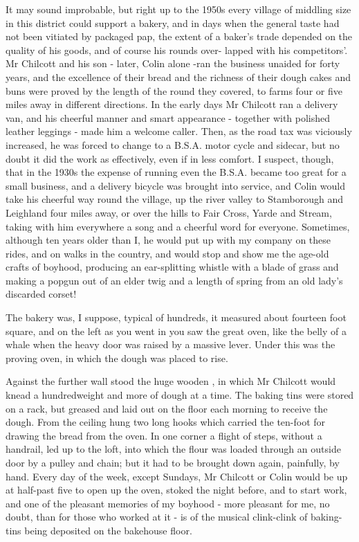 It may sound improbable, but right up to the 1950s every village of middling size in this district could support a bakery, and in days when the general taste had not been vitiated by packaged pap, the extent of a baker's trade depended on the quality of his goods, and of course his rounds over- lapped with his competitors'. Mr Chilcott and his son - later, Colin alone -ran the business unaided for forty years, and the excellence of their bread and the richness of their dough cakes and buns were proved by the length of the round they covered, to farms four or five miles away in different directions. In the early days Mr Chilcott ran a delivery van, and his cheerful manner and smart appearance - together with polished leather leggings - made him a welcome caller. Then, as the road tax was viciously increased, he was forced to change to a B.S.A. motor cycle and sidecar, but no doubt it did the work as effectively, even if in less comfort. I suspect, though, that in the 1930s the expense of running even the B.S.A. became too great for a small business, and a delivery bicycle was brought into service, and Colin would take his cheerful way round the village, up the river valley to Stamborough and Leighland four miles away, or over the hills to Fair Cross, Yarde and Stream, taking with him everywhere a song and a cheerful word for everyone. Sometimes, although ten years older than I, he would put up with my company on these rides, and on walks in the country, and would stop and show me the age-old crafts of boyhood, producing an ear-splitting whistle with a blade of grass and making a popgun out of an elder twig and a length of spring from an old lady's discarded corset!

The bakery was, I suppose, typical of hundreds, it measured about fourteen foot square, and on the left as you went in you saw the great oven, like the belly of a whale when the heavy door was raised by a massive lever. Under this was the proving oven, in which the dough was placed to rise.

Against the further wall stood the huge wooden , in which Mr Chilcott would knead a hundredweight and more of dough at a time. The baking tins were stored on a rack, but greased and laid out on the floor each morning to receive the dough. From the ceiling hung two long hooks which carried the ten-foot  for drawing the bread from the oven. In one corner a flight of steps, without a handrail, led up to the loft, into which the flour was loaded through an outside door by a pulley and chain; but it had to be brought down again, painfully, by hand. Every day of the week, except Sundays, Mr Chilcott or Colin would be up at half-past five to open up the oven, stoked the night before, and to start work, and one of the pleasant memories of my boyhood - more pleasant for me, no doubt, than for those who worked at it - is of the musical clink-clink of baking-tins being deposited on the bakehouse floor.

